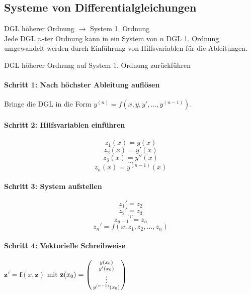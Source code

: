 \subsection{Systeme von Differentialgleichungen}

\begin{concept}{DGL höherer Ordnung $\rightarrow$ System 1. Ordnung}\\
Jede DGL $n$-ter Ordnung kann in ein System von $n$ DGL 1. Ordnung umgewandelt werden durch Einführung von Hilfsvariablen für die Ableitungen.
\end{concept}

\begin{KR}{DGL höherer Ordnung auf System 1. Ordnung zurückführen}
\paragraph{Schritt 1: Nach höchster Ableitung auflösen}
Bringe die DGL in die Form $y^{(n)} = f(x, y, y', ..., y^{(n-1)})$.
\vspace{2mm}\\
\begin{minipage}{0.45\linewidth}
\paragraph{Schritt 2: Hilfsvariablen einführen}
\vspace{-3mm}
$$z_1(x) = y(x)$$
$$z_2(x) = y'(x)$$
$$z_3(x) = y''(x)$$
$$...$$
$$z_n(x) = y^{(n-1)}(x)$$
\end{minipage}
\hspace{2mm}
\begin{minipage}{0.5\linewidth}
\paragraph{Schritt 3: System aufstellen}
\vspace{-3mm}
$$z_1' = z_2$$
$$z_2' = z_3$$
$$...$$
$$z_{n-1}' = z_n$$
$$z_n' = f(x, z_1, z_2, ..., z_n)$$
\end{minipage}

\paragraph{Schritt 4: Vektorielle Schreibweise}
$\mathbf{z}' = \mathbf{f}(x, \mathbf{z})$ mit $\mathbf{z}(x_0) = \begin{psmallmatrix} y(x_0) \\ y'(x_0) \\ \vdots \\ y^{(n-1)}(x_0) \end{psmallmatrix}$
\end{KR}

